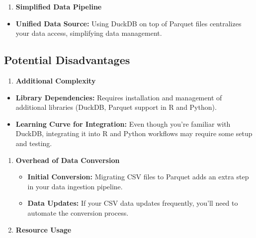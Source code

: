 \documentclass[
  american,
  10,
  a4paper,
]{book}
\providecommand{\tightlist}{%
  \setlength{\itemsep}{0pt}\setlength{\parskip}{0pt}}
\theoremstyle{definition}
\theoremstyle{remark}
\begin{document}
\begin{enumerate}
\def\labelenumi{\arabic{enumi}.}
\setcounter{enumi}{4}
\tightlist
\item
  \textbf{Simplified Data Pipeline}
\end{enumerate}

\begin{itemize}
\tightlist
\item
  \textbf{Unified Data Source:} Using DuckDB on top of Parquet files
  centralizes your data access, simplifying data management.
\end{itemize}

\subsection{\texorpdfstring{\textbf{Potential
Disadvantages}}{Potential Disadvantages}}\label{potential-disadvantages}

\begin{enumerate}
\def\labelenumi{\arabic{enumi}.}
\tightlist
\item
  \textbf{Additional Complexity}
\end{enumerate}

\begin{itemize}
\tightlist
\item
  \textbf{Library Dependencies:} Requires installation and management of
  additional libraries (DuckDB, Parquet support in R and Python).
\item
  \textbf{Learning Curve for Integration:} Even though you're familiar
  with DuckDB, integrating it into R and Python workflows may require
  some setup and testing.
\end{itemize}

\begin{enumerate}
\def\labelenumi{\arabic{enumi}.}
\setcounter{enumi}{1}
\item
  \textbf{Overhead of Data Conversion}

  \begin{itemize}
  \tightlist
  \item
    \textbf{Initial Conversion:} Migrating CSV files to Parquet adds an
    extra step in your data ingestion pipeline.
  \item
    \textbf{Data Updates:} If your CSV data updates frequently, you'll
    need to automate the conversion process.
  \end{itemize}
\item
  \textbf{Resource Usage}
\end{enumerate}
\end{document}
